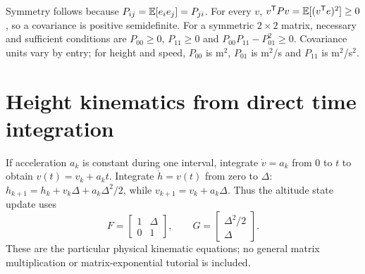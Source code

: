 Symmetry follows because $P_{ij}=\mathbb{E}[e_i e_j]=P_{ji}$. For every $v$,
$v^{\mathsf T}Pv=\mathbb{E}[(v^{\mathsf T}e)^2]\geq0$, so a covariance is positive
semidefinite. For a symmetric $2\times2$ matrix, necessary and sufficient
conditions are $P_{00}\geq0$, $P_{11}\geq0$ and
$P_{00}P_{11}-P_{01}^2\geq0$. Covariance units vary by entry; for height and
speed, $P_{00}$ is m$^2$, $P_{01}$ is m$^2$/s and $P_{11}$ is m$^2$/s$^2$.

\section{Height kinematics from direct time integration}
If acceleration $a_k$ is constant during one interval, integrate $\dot v=a_k$
from $0$ to $t$ to obtain $v(t)=v_k+a_kt$. Integrate $\dot h=v(t)$ from zero
to $\Delta$: $h_{k+1}=h_k+v_k\Delta+a_k\Delta^2/2$, while
$v_{k+1}=v_k+a_k\Delta$. Thus the altitude state update uses
\begin{equation}
F=\begin{bmatrix}1&\Delta\\0&1\end{bmatrix},\qquad
G=\begin{bmatrix}\Delta^2/2\\\Delta\end{bmatrix}.
\end{equation}
These are the particular physical kinematic equations; no general matrix
multiplication or matrix-exponential tutorial is included.

